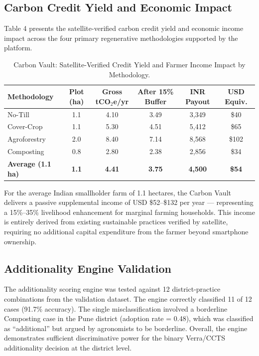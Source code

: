 \documentclass[10pt,a4paper]{article}
\begin{document}
\subsection{Carbon Credit Yield and Economic Impact}
Table 4 presents the satellite-verified carbon credit yield and economic income impact across the four primary regenerative methodologies supported by the platform.

\begin{table}[H]
\centering
\caption{Carbon Vault: Satellite-Verified Credit Yield and Farmer Income Impact by Methodology.}
\begin{tabular}{|l|c|c|c|c|c|}
\hline
\textbf{Methodology} & \textbf{Plot (ha)} & \textbf{Gross tCO$_2$e/yr} & \textbf{After 15\% Buffer} & \textbf{INR Payout} & \textbf{USD Equiv.} \\
\hline
No-Till & 1.1 & 4.10 & 3.49 & \rupee{}3,349 & \$40 \\
Cover-Crop & 1.1 & 5.30 & 4.51 & \rupee{}5,412 & \$65 \\
Agroforestry & 2.0 & 8.40 & 7.14 & \rupee{}8,568 & \$102 \\
Composting & 0.8 & 2.80 & 2.38 & \rupee{}2,856 & \$34 \\
\hline
\textbf{Average (1.1 ha)} & \textbf{1.1} & \textbf{4.41} & \textbf{3.75} & \textbf{\rupee{}4,500} & \textbf{\$54} \\
\hline
\end{tabular}
\end{table}

For the average Indian smallholder farm of 1.1 hectares, the Carbon Vault delivers a passive supplemental income of USD \$52--\$132 per year — representing a 15\%--35\% livelihood enhancement for marginal farming households. This income is entirely derived from existing sustainable practices verified by satellite, requiring no additional capital expenditure from the farmer beyond smartphone ownership.

\subsection{Additionality Engine Validation}
The additionality scoring engine was tested against 12 district-practice combinations from the validation dataset. The engine correctly classified 11 of 12 cases (91.7\% accuracy). The single misclassification involved a borderline Composting case in the Pune district (adoption rate = 0.48), which was classified as ``additional'' but argued by agronomists to be borderline. Overall, the engine demonstrates sufficient discriminative power for the binary Verra/CCTS additionality decision at the district level.
\end{document}
